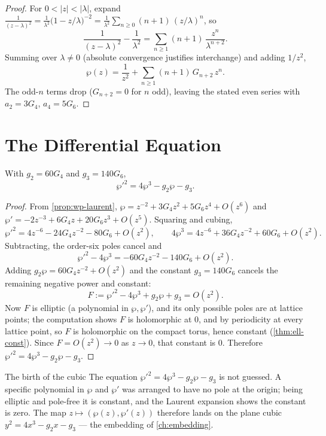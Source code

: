 \begin{proof}
For \(0 < |z| < |\lambda|\), expand \(\frac{1}{(z-\lambda)^2} =
\frac{1}{\lambda^2}\bigl(1 - z/\lambda\bigr)^{-2}
= \frac{1}{\lambda^2} \sum_{n \ge 0} (n+1)\,(z/\lambda)^n\), so
\[
  \frac{1}{(z-\lambda)^2} - \frac{1}{\lambda^2}
  = \sum_{n \ge 1} (n+1)\,\frac{z^n}{\lambda^{n+2}} .
\]
Summing over \(\lambda \ne 0\) (absolute convergence justifies interchange) and
adding \(1/z^2\),
\[
  \wp(z) = \frac{1}{z^2} + \sum_{n \ge 1} (n+1)\,G_{n+2}\,z^n .
\]
The odd-\(n\) terms drop (\(G_{n+2} = 0\) for \(n\) odd), leaving the stated even
series with \(a_2 = 3G_4\), \(a_4 = 5G_6\).
\end{proof}

\section{The Differential Equation}
\label{sec:wp-ode}

\begin{theorem}
\label{thm:wp-ode}
With \(g_2 = 60 G_4\) and \(g_3 = 140 G_6\),
\[
  \boxed{\ \wp'^2 = 4\wp^3 - g_2 \wp - g_3 .\ }
\]
\end{theorem}

\begin{proof}
From \cref{prop:wp-laurent}, \(\wp = z^{-2} + 3G_4 z^2 + 5G_6 z^4 + O(z^6)\) and
\(\wp' = -2z^{-3} + 6 G_4 z + 20 G_6 z^3 + O(z^5)\). Squaring and cubing,
\[
  \wp'^2 = 4 z^{-6} - 24 G_4 z^{-2} - 80 G_6 + O(z^2),
  \qquad
  4\wp^3 = 4 z^{-6} + 36 G_4 z^{-2} + 60 G_6 + O(z^2).
\]
Subtracting, the order-six poles cancel and
\[
  \wp'^2 - 4\wp^3 = -60 G_4 z^{-2} - 140 G_6 + O(z^2).
\]
Adding \(g_2 \wp = 60 G_4 z^{-2} + O(z^2)\) and the constant \(g_3 = 140 G_6\)
cancels the remaining negative power and constant:
\[
  F := \wp'^2 - 4\wp^3 + g_2 \wp + g_3 = O(z^2) .
\]
Now \(F\) is elliptic (a polynomial in \(\wp, \wp'\)), and its only possible poles
are at lattice points; the computation shows \(F\) is holomorphic at \(0\), and by
periodicity at every lattice point, so \(F\) is holomorphic on the compact torus,
hence constant (\cref{thm:ell-const}). Since \(F = O(z^2) \to 0\) as
\(z \to 0\), that constant is \(0\). Therefore \(\wp'^2 = 4\wp^3 - g_2\wp - g_3\).
\end{proof}

\begin{keyidea}{The birth of the cubic}
The equation \(\wp'^2 = 4\wp^3 - g_2\wp - g_3\) is not guessed. A specific
polynomial in \(\wp\) and \(\wp'\) was arranged to have no pole at the origin;
being elliptic and pole-free it is constant, and the Laurent expansion shows the
constant is zero. The map \(z \mapsto (\wp(z), \wp'(z))\) therefore lands on the
plane cubic \(y^2 = 4x^3 - g_2 x - g_3\) --- the embedding of
\cref{ch:embedding}.
\end{keyidea}

